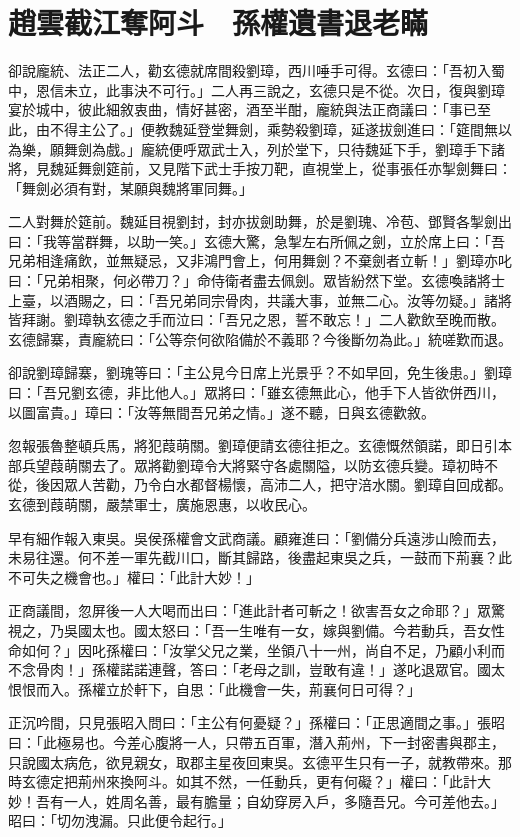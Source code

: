 
\chapter{趙雲截江奪阿斗　孫權遺書退老瞞}

卻說龐統、法正二人，勸玄德就席間殺劉璋，西川唾手可得。玄德曰：「吾初入蜀中，恩信未立，此事決不可行。」二人再三說之，玄德只是不從。次日，復與劉璋宴於城中，彼此細敘衷曲，情好甚密，酒至半酣，龐統與法正商議曰：「事已至此，由不得主公了。」便教魏延登堂舞劍，乘勢殺劉璋，延遂拔劍進曰：「筵間無以為樂，願舞劍為戲。」龐統便呼眾武士入，列於堂下，只待魏延下手，劉璋手下諸將，見魏延舞劍筵前，又見階下武士手按刀靶，直視堂上，從事張任亦掣劍舞曰：「舞劍必須有對，某願與魏將軍同舞。」

二人對舞於筵前。魏延目視劉封，封亦拔劍助舞，於是劉瑰、冷苞、鄧賢各掣劍出曰：「我等當群舞，以助一笑。」玄德大驚，急掣左右所佩之劍，立於席上曰：「吾兄弟相逢痛飲，並無疑忌，又非鴻門會上，何用舞劍？不棄劍者立斬！」劉璋亦叱曰：「兄弟相聚，何必帶刀？」命侍衛者盡去佩劍。眾皆紛然下堂。玄德喚諸將士上臺，以酒賜之，曰：「吾兄弟同宗骨肉，共議大事，並無二心。汝等勿疑。」諸將皆拜謝。劉璋執玄德之手而泣曰：「吾兄之恩，誓不敢忘！」二人歡飲至晚而散。玄德歸寨，責龐統曰：「公等奈何欲陷備於不義耶？今後斷勿為此。」統嗟歎而退。

卻說劉璋歸寨，劉瑰等曰：「主公見今日席上光景乎？不如早回，免生後患。」劉璋曰：「吾兄劉玄德，非比他人。」眾將曰：「雖玄德無此心，他手下人皆欲併西川，以圖富貴。」璋曰：「汝等無間吾兄弟之情。」遂不聽，日與玄德歡敘。

忽報張魯整頓兵馬，將犯葭萌關。劉璋便請玄德往拒之。玄德慨然領諾，即日引本部兵望葭萌關去了。眾將勸劉璋令大將緊守各處關隘，以防玄德兵變。璋初時不從，後因眾人苦勸，乃令白水都督楊懷，高沛二人，把守涪水關。劉璋自回成都。玄德到葭萌關，嚴禁軍士，廣施恩惠，以收民心。

早有細作報入東吳。吳侯孫權會文武商議。顧雍進曰：「劉備分兵遠涉山險而去，未易往還。何不差一軍先截川口，斷其歸路，後盡起東吳之兵，一鼓而下荊襄？此不可失之機會也。」權曰：「此計大妙！」

正商議間，忽屏後一人大喝而出曰：「進此計者可斬之！欲害吾女之命耶？」眾驚視之，乃吳國太也。國太怒曰：「吾一生唯有一女，嫁與劉備。今若動兵，吾女性命如何？」因叱孫權曰：「汝掌父兄之業，坐領八十一州，尚自不足，乃顧小利而不念骨肉！」孫權諾諾連聲，答曰：「老母之訓，豈敢有違！」遂叱退眾官。國太恨恨而入。孫權立於軒下，自思：「此機會一失，荊襄何日可得？」

正沉吟間，只見張昭入問曰：「主公有何憂疑？」孫權曰：「正思適間之事。」張昭曰：「此極易也。今差心腹將一人，只帶五百軍，潛入荊州，下一封密書與郡主，只說國太病危，欲見親女，取郡主星夜回東吳。玄德平生只有一子，就教帶來。那時玄德定把荊州來換阿斗。如其不然，一任動兵，更有何礙？」權曰：「此計大妙！吾有一人，姓周名善，最有膽量；自幼穿房入戶，多隨吾兄。今可差他去。」昭曰：「切勿洩漏。只此便令起行。」

